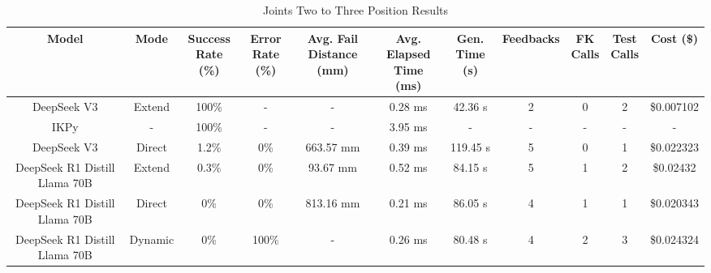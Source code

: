 \begin{landscape}
\begin{table}[H]
\tiny
\renewcommand{\arraystretch}{1.2}
\caption{Joints Two to Three Position Results}
\begin{center}
\begin{tabular}{|c|c|c|c|c|c|c|c|c|c|c|}
    \hline
    \textbf{Model} & 
    \textbf{Mode} & 
    \makecell{\textbf{Success}\\\textbf{Rate (\%)}} &
    \makecell{\textbf{Error}\\\textbf{Rate (\%)}} &
    \makecell{\textbf{Avg. Fail}\\\textbf{Distance (mm)}} &
    \makecell{\textbf{Avg. Elapsed}\\\textbf{Time (ms)}} &
    \makecell{\textbf{Gen.}\\\textbf{Time (s)}} &
    \textbf{Feedbacks} &
    \makecell{\textbf{FK}\\\textbf{Calls}} &
    \makecell{\textbf{Test}\\\textbf{Calls}} &
    \textbf{Cost (\$)} \\
    \hline
    DeepSeek V3 & Extend & 100\% & - & - & 0.28 ms & 42.36 s & 2 & 0 & 2 & \$0.007102 \\
    \hline
    IKPy & - & 100\% & - & - & 3.95 ms & - & - & - & - & - \\
    \hline
    DeepSeek V3 & Direct & 1.2\% & 0\% & 663.57 mm & 0.39 ms & 119.45 s & 5 & 0 & 1 & \$0.022323 \\
    \hline
    DeepSeek R1 Distill Llama 70B & Extend & 0.3\% & 0\% & 93.67 mm & 0.52 ms & 84.15 s & 5 & 1 & 2 & \$0.02432 \\
    \hline
    DeepSeek R1 Distill Llama 70B & Direct & 0\% & 0\% & 813.16 mm & 0.21 ms & 86.05 s & 4 & 1 & 1 & \$0.020343 \\
    \hline
    DeepSeek R1 Distill Llama 70B & Dynamic & 0\% & 100\% & - & 0.26 ms & 80.48 s & 4 & 2 & 3 & \$0.024324 \\
    \hline
\end{tabular}
\label{Results-Position-2-3}
\end{center}
\end{table}


\end{landscape}

